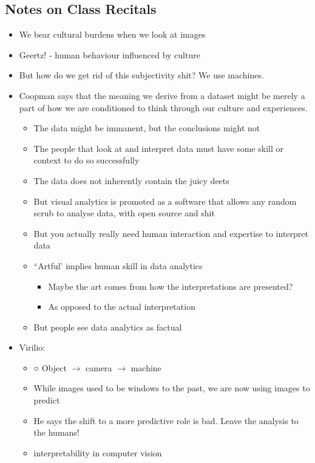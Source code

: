\documentclass[a4paper]{article}
\begin{document}
\subsection{Notes on Class Recitals}
\begin{itemize}
	\item We bear cultural burdens when we look at images
	\item Geertz! - human behaviour influenced by culture
	\item But how do we get rid of this subjectivity shit? We use machines.
	\item Coopman says that the meaning we derive from a dataset might be merely a part of how we are conditioned to think through our culture and experiences.
	\begin{itemize}[label=$\circ$]
		\item The data might be immanent, but the conclusions might not
		\item The people that look at and interpret data must have some skill or context to do so successfully
		\item The data does not inherently contain the juicy deets
		\item But visual analytics is promoted as a software that allows any random scrub to analyse data, with open source and shit
		\item But you actually really need human interaction and expertise to interpret data
		\item ``Artful' implies human skill in data analytics
		\begin{itemize}[label=\tiny$\blacksquare$]
			\item Maybe the art comes from how the interpretations are presented?
			\item As opposed to the actual interpretation
		\end{itemize}
		\item But people see data analytics as factual
	\end{itemize}
	\item Virilio:
	\begin{itemize}[label=$\circ$]
		\item ○	Object $\rightarrow$ camera $\rightarrow$ machine
		\item While images used to be windows to the past, we are now using images to predict
		\item He says the shift to a more predictive role is bad. Leave the analysis to the humans! 
		\item interpretability in computer vision

\end{itemize}
\end{itemize}
\end{document}
